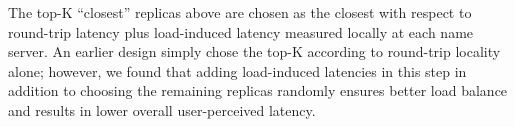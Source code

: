 {The top-K ``closest'' replicas above are chosen as the closest with respect to round-trip latency plus load-induced latency measured locally at each name server. An earlier design simply chose the top-K according to round-trip locality alone; however, we found that adding load-induced latencies in this step in addition to choosing the remaining replicas randomly ensures better load balance and results in lower overall user-perceived latency.




}




%
%
%
%
%



